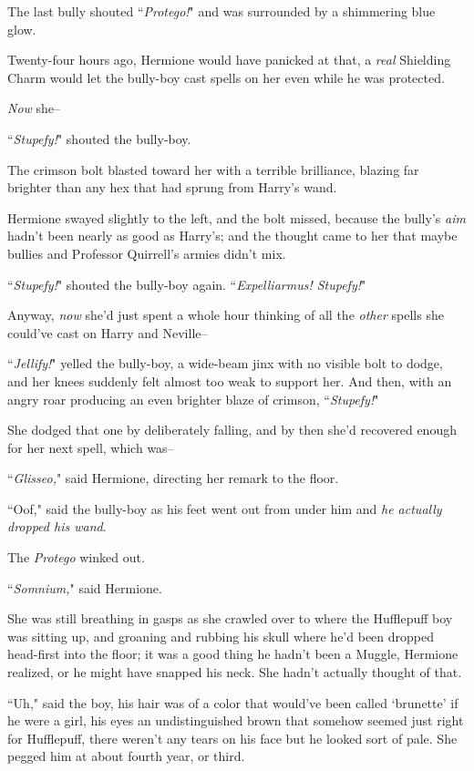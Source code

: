 The last bully shouted ``\emph{Protego!}" and was surrounded by a shimmering blue glow.

Twenty-four hours ago, Hermione would have panicked at that, a \emph{real} Shielding Charm would let the bully-boy cast spells on her even while he was protected.

\emph{Now} she\---

``\emph{Stupefy!}" shouted the bully-boy.

The crimson bolt blasted toward her with a terrible brilliance, blazing far brighter than any hex that had sprung from Harry's wand.

Hermione swayed slightly to the left, and the bolt missed, because the bully's \emph{aim} hadn't been nearly as good as Harry's; and the thought came to her that maybe bullies and Professor Quirrell's armies didn't mix.

``\emph{Stupefy!}" shouted the bully-boy again. ``\emph{Expelliarmus! Stupefy!}"

Anyway, \emph{now} she'd just spent a whole hour thinking of all the \emph{other} spells she could've cast on Harry and Neville\---

``\emph{Jellify!}" yelled the bully-boy, a wide-beam jinx with no visible bolt to dodge, and her knees suddenly felt almost too weak to support her. And then, with an angry roar producing an even brighter blaze of crimson, ``\emph{Stupefy!}"

She dodged that one by deliberately falling, and by then she'd recovered enough for her next spell, which was\---

``\emph{Glisseo,}" said Hermione, directing her remark to the floor.

``Oof," said the bully-boy as his feet went out from under him and \emph{he actually dropped his wand}.

The \emph{Protego} winked out.

``\emph{Somnium,}" said Hermione.

She was still breathing in gasps as she crawled over to where the Hufflepuff boy was sitting up, and groaning and rubbing his skull where he'd been dropped head-first into the floor; it was a good thing he hadn't been a Muggle, Hermione realized, or he might have snapped his neck. She hadn't actually thought of that.

``Uh," said the boy, his hair was of a color that would've been called `brunette' if he were a girl, his eyes an undistinguished brown that somehow seemed just right for Hufflepuff, there weren't any tears on his face but he looked sort of pale. She pegged him at about fourth year, or third.

